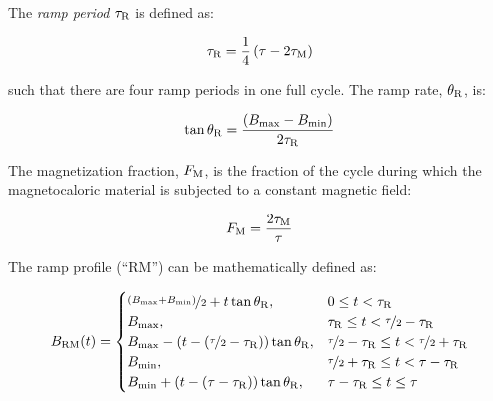 \documentclass[referee]{svjour3}
\begin{document}
The \emph{ramp period} \(\tau_{\mathrm{R}}\) is defined as:

\begin{equation}
\label{eq:201}
\tau_{\mathrm{R}} = \frac{1}{4}\left(\tau - 2 \tau_{\mathrm{M}}\right)
\end{equation}

\noindent such that there are four ramp periods in one full cycle. The ramp rate, \(\theta_{\mathrm{R}}\), is:

\begin{equation}
\label{eq:202}
\tan \theta_{\mathrm{R}} = \frac{\left({B}_{\mathrm{max}} - {B}_{\mathrm{min}}\right)}{2\tau_{\mathrm{R}}}
\end{equation}


The magnetization fraction, \(F_{\mathrm{M}}\), is the fraction of the cycle during which the magnetocaloric material is subjected to a constant magnetic field:

\begin{equation}
\label{eq:204}
F_{\mathrm{M}} = \frac{2\tau_{\mathrm{M}}}{\tau}
\end{equation}


The ramp profile (``RM'') can be mathematically defined as:

\begin{equation}
{B}_{\mathrm{RM}}(t)=
\begin{cases}
\nicefrac{\left({B}_{\mathrm{max}} + {B}_{\mathrm{min}}\right)}{2} + t \tan \theta_{\mathrm{R}} , & 0 \le t < \tau_{\mathrm{R}} \\
{B}_{\mathrm{max}}, & \tau_{\mathrm{R}} \le t < \nicefrac{\tau}{2} - \tau_{\mathrm{R}}\\
{B}_{\mathrm{max}} - \left(t - \left(\nicefrac{\tau}{2} - \tau_{\mathrm{R}}\right)\right) \tan \theta_{\mathrm{R}} , & \nicefrac{\tau}{2} - \tau_{\mathrm{R}} \le t < \nicefrac{\tau}{2} + \tau_{\mathrm{R}} \\
{B}_{\mathrm{min}}, & \nicefrac{\tau}{2} + \tau_{\mathrm{R}} \le t < \tau - \tau_{\mathrm{R}}\\
{B}_{\mathrm{min}} + \left(t - \left(\tau - \tau_{\mathrm{R}}\right)\right) \tan \theta_{\mathrm{R}} , & \tau - \tau_{\mathrm{R}} \le t \le \tau \\
\end{cases}
\label{eq:203}
\end{equation}
\end{document}

